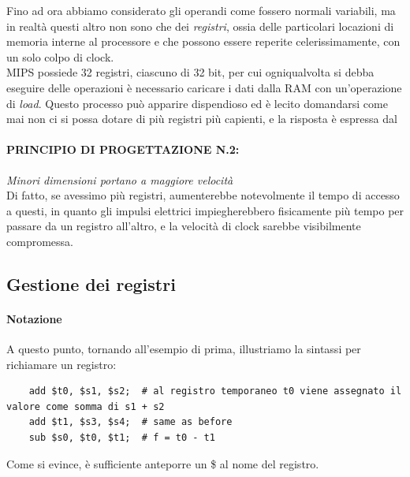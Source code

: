 \documentclass[class=book, crop=false]{standalone}
\begin{document}
Fino ad ora abbiamo considerato gli operandi come fossero normali variabili, ma in realtà questi altro non sono che dei \emph{registri}, ossia delle particolari locazioni di memoria interne al processore e che possono essere reperite celerissimamente, con un solo colpo di clock.\\
MIPS possiede 32 registri, ciascuno di 32 bit, per cui ogniqualvolta si debba eseguire delle operazioni è necessario caricare i dati dalla RAM con un'operazione di \emph{load}. Questo processo può apparire dispendioso ed è lecito domandarsi come mai non ci si possa dotare di più registri più capienti, e la risposta è espressa dal

\paragraph{PRINCIPIO DI PROGETTAZIONE N.2:}
\emph{Minori dimensioni portano a maggiore velocità}\\

Di fatto, se avessimo  più registri, aumenterebbe notevolmente il tempo di accesso a questi, in quanto gli impulsi elettrici impiegherebbero fisicamente più tempo per passare da un registro all'altro, e la velocità di clock sarebbe visibilmente compromessa.

\subsection{Gestione dei registri}

\paragraph{Notazione}
A questo punto, tornando all'esempio di prima, illustriamo la sintassi per richiamare un registro:
\begin{verbatim}
	add $t0, $s1, $s2;  # al registro temporaneo t0 viene assegnato il valore come somma di s1 + s2
	add $t1, $s3, $s4;  # same as before
	sub $s0, $t0, $t1;  # f = t0 - t1
\end{verbatim}
Come si evince, è sufficiente anteporre un \$ al nome del registro.
\end{document}

